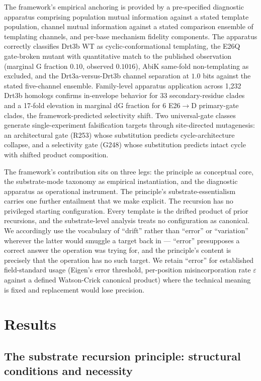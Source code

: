 \documentclass[aps,prx,reprint,amsmath,amssymb,floatfix,superscriptaddress,nofootinbib]{revtex4-2}
\theoremstyle{plain-thm}
\theoremstyle{definition-thm}
\begin{document}
The framework's empirical anchoring is provided by a pre-specified diagnostic apparatus comprising population mutual information against a stated template population, channel mutual information against a stated comparison ensemble of templating channels, and per-base mechanism fidelity components. The apparatus correctly classifies Drt3b WT as cyclic-conformational templating, the E26Q gate-broken mutant with quantitative match to the published observation (marginal G fraction $0.10$, observed $0.1016$), AbiK same-fold non-templating as excluded, and the Drt3a-versus-Drt3b channel separation at $1.0$ bits against the stated five-channel ensemble. Family-level apparatus application across 1{,}232 Drt3b homologs confirms in-envelope behavior for 33 secondary-residue clades and a 17-fold elevation in marginal dG fraction for 6 E26$\to$D primary-gate clades, the framework-predicted selectivity shift. Two universal-gate classes generate single-experiment falsification targets through site-directed mutagenesis: an architectural gate (R253) whose substitution predicts cycle-architecture collapse, and a selectivity gate (G248) whose substitution predicts intact cycle with shifted product composition.

The framework's contribution sits on three legs: the principle as conceptual core, the substrate-mode taxonomy as empirical instantiation, and the diagnostic apparatus as operational instrument. The principle's substrate-essentialism carries one further entailment that we make explicit. The recursion has no privileged starting configuration. Every template is the drifted product of prior recursions, and the substrate-level analysis treats no configuration as canonical. We accordingly use the vocabulary of ``drift'' rather than ``error'' or ``variation'' wherever the latter would smuggle a target back in --- ``error'' presupposes a correct answer the operation was trying for, and the principle's content is precisely that the operation has no such target. We retain ``error'' for established field-standard usage (Eigen's error threshold, per-position misincorporation rate $\varepsilon$ against a defined Watson-Crick canonical product) where the technical meaning is fixed and replacement would lose precision.


\section{Results}

\subsection{The substrate recursion principle: structural conditions and necessity}
\end{document}
